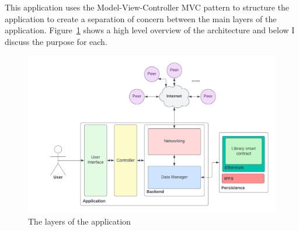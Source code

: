 
This application uses the Model-View-Controller MVC pattern to structure the application to create a separation of concern between the main layers of the application. Figure~\ref{fig:impl-layers} shows a high level overview of the architecture and below I discuss the purpose for each.

\begin{figure}[ht]
  \centering
  \includegraphics[width=.8\textwidth]{assets/images/diagrams/layers.png}
  \caption{The layers of the application}
  \label{fig:impl-layers}
\end{figure}






